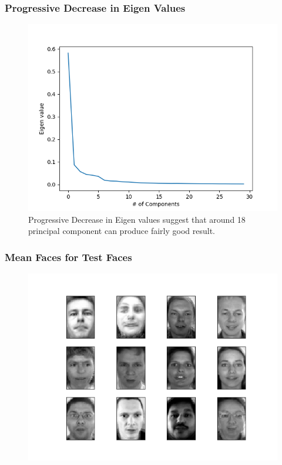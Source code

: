 \documentclass[11pt]{beamer}
\begin{document}
\begin{frame}
\frametitle{Progressive Decrease in Eigen Values}
\begin{figure}
\includegraphics[width=.8\textwidth]{Eigen_values.png}
\caption{Progressive Decrease in Eigen values suggest that around 18 principal component can produce fairly good result.}
\end{figure}
\end{frame}

\begin{frame}
\frametitle{Mean Faces for Test Faces}
\begin{figure}
\includegraphics[width=.95\textwidth]{mean_image.png}
\end{figure}
\end{frame}
\end{document}
